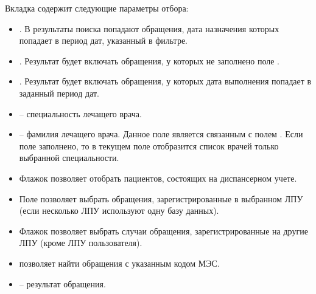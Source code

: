 Вкладка  содержит следующие параметры отбора:
\begin{itemize}
 \item {}. В результаты поиска попадают обращения, дата назначения которых попадает в период дат, указанный в фильтре.
 \item {}. Результат будет включать обращения, у которых не заполнено поле .
 \item {}. Результат будет включать обращения, у которых дата выполнения попадает в заданный период дат.
 \item {} – специальность лечащего врача.
 \item {} – фамилия лечащего врача. Данное поле является связанным с полем . Если поле  заполнено, то в текущем поле отобразится список врачей только выбранной специальности.
 \item Флажок  позволяет отобрать пациентов, состоящих на диспансерном учете.
 \item Поле  позволяет выбрать обращения, зарегистрированные в выбранном ЛПУ (если несколько ЛПУ используют одну базу данных).
 \item Флажок  позволяет выбрать случаи обращения, зарегистрированные на другие ЛПУ (кроме ЛПУ пользователя).
 \item {} позволяет найти обращения с указанным кодом МЭС.
 \item {} – результат обращения.
\end{itemize}
 

